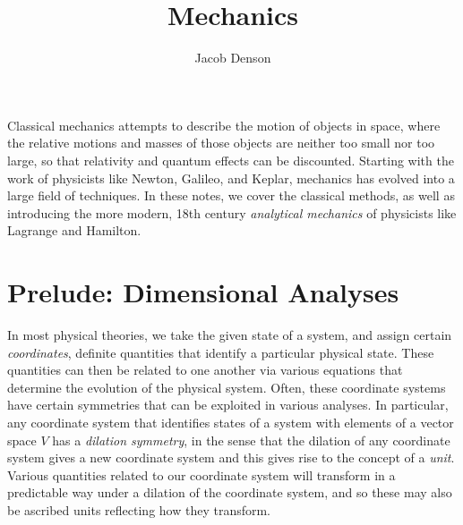 

\title{Mechanics}
\author{Jacob Denson}




\maketitle



\begin{center}
Classical mechanics attempts to describe the motion of objects in space, where the relative motions and masses of those objects are neither too small nor too large, so that relativity and quantum effects can be discounted. Starting with the work of physicists like Newton, Galileo, and Keplar, mechanics has evolved into a large field of techniques. In these notes, we cover the classical methods, as well as introducing the more modern, 18th century \emph{analytical mechanics} of physicists like Lagrange and Hamilton.
\end{center}

\chapter{Prelude: Dimensional Analyses}

In most physical theories, we take the given state of a system, and assign certain \emph{coordinates}, definite quantities that identify a particular physical state. These quantities can then be related to one another via various equations that determine the evolution of the physical system. Often, these coordinate systems have certain symmetries that can be exploited in various analyses. In particular, any coordinate system that identifies states of a system with elements of a vector space $V$ has a \emph{dilation symmetry}, in the sense that the dilation of any coordinate system gives a new coordinate system and this gives rise to the concept of a \emph{unit}. Various quantities related to our coordinate system will transform in a predictable way under a dilation of the coordinate system, and so these may also be ascribed units reflecting how they transform.

